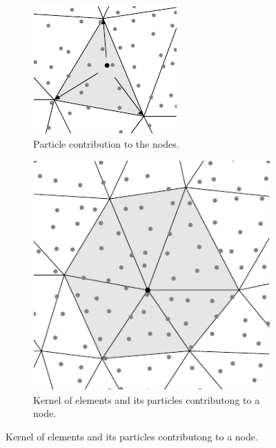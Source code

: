 \begin{figure}
\begin{subfigure}{0.47\textwidth}
    \centering
    \includegraphics[width=\textwidth]{img/lagrangian/projection.pdf}
    \caption{Particle contribution to the nodes.}
    \label{pfem2_projection}
\end{subfigure}
\hfill
\begin{subfigure}{0.47\textwidth}
    \centering
    \includegraphics[width=\textwidth]{img/lagrangian/projection_full.pdf}
    \caption{Kernel of elements and its particles contributong to a node.}
    \label{pfem2_projection_full}
\end{subfigure}
\end{figure}

